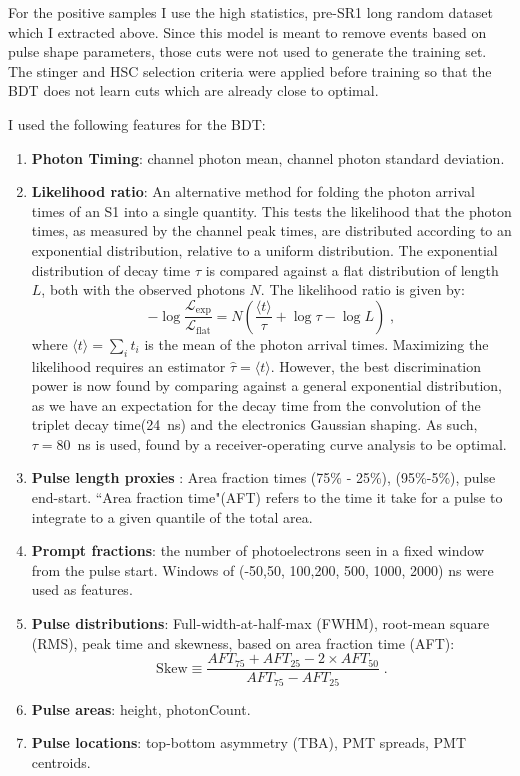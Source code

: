 For the positive samples I use the high statistics, pre-SR1 long random dataset which I extracted above.
Since this model is meant to remove events based on pulse shape parameters, those cuts were not used to generate the training set.
The stinger and HSC selection criteria were applied before training so that the BDT does not learn cuts which are already close to optimal.


I used the following features for the BDT:

\begin{enumerate}
    \item \textbf{Photon Timing}: channel photon mean, channel photon standard deviation.
    \item \textbf{Likelihood ratio}: An alternative method for folding the photon arrival times of an S1 into a single quantity.
    This tests the likelihood that the photon times, as measured by the channel peak times, are distributed according to an exponential distribution, relative to a uniform distribution.
    The exponential distribution of decay time $\tau$ is compared against a flat distribution of length $L$, both with the observed photons $N$.
    The likelihood ratio is given by: 
    \begin{equation}
        - \log \frac{ \mathcal{L}_{\mathrm{exp}}}{\mathcal{L}_{\mathrm{flat}}} = N(\frac{\langle t \rangle }{\tau} + \log \tau - \log L )\;,
    \end{equation}
    where $\langle t \rangle = \sum_i t_i$ is the mean of the photon arrival times.
    Maximizing the likelihood requires an estimator $\hat \tau = \langle t \rangle$.
    However, the best discrimination power is now found by comparing against a general exponential distribution, as we have an expectation for the decay time from the convolution of the triplet decay time(24~ns) and the electronics Gaussian shaping.
    As such, $\tau=80$~ns is used, found by a receiver-operating curve analysis to be optimal.
    \item \textbf{Pulse length proxies} : Area fraction times (75\% - 25\%), (95\%-5\%), pulse end-start.
    ``Area fraction time"(AFT) refers to the time it take for a pulse to integrate to a given quantile of the total area.
    \item \textbf{Prompt fractions}: the number of photoelectrons seen in a fixed window from the pulse start.
    Windows of (-50,50, 100,200, 500, 1000, 2000) ns were used as features.
    \item \textbf{Pulse distributions}: Full-width-at-half-max (FWHM), root-mean square (RMS), peak time and skewness, based on area fraction time (AFT): 
    \begin{equation}
    \mathrm{Skew} \equiv \frac{AFT_{75}+AFT_{25} - 2\times AFT_{50} }{AFT_{75}- AFT_{25} }\;.
    \end{equation}
    \item \textbf{Pulse areas}: height, photonCount.
    \item \textbf{Pulse locations}: top-bottom asymmetry (TBA), PMT spreads, PMT centroids.
\end{enumerate}



